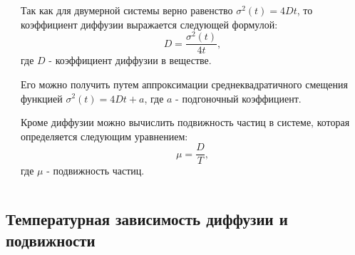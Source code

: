 \documentclass[pdf,hyperref={unicode}]{beamer}
\begin{document}
\begin{frame}
\begin{columns}
\begin{column}{0.55\linewidth}
\end{column}
\begin{column}{0.45\linewidth}
\tiny{

Так как для двумерной системы верно равенство $\sigma^2(t) = 4Dt$, то коэффициент диффузии выражается следующей формулой:
\begin{equation}
    D = \frac{\sigma^2(t)}{4t},
    \label{eqD}
\end{equation}
где $D$ - коэффициент диффузии в веществе.

Его можно получить путем аппроксимации среднеквадратичного смещения функцией $\sigma^2(t) = 4Dt + a$, где $a$ - подгоночный коэффициент.

Кроме диффузии можно вычислить подвижность частиц в системе, которая определяется следующим уравнением:
\begin{equation}
    \mu  = \frac{D}{T},
    \label{eqMuDiff}
\end{equation}
где $\mu$ - подвижность частиц.
}
\end{column}


\end{columns}
\end{frame}


\subsection{Температурная зависимость диффузии и подвижности}
\end{document}
